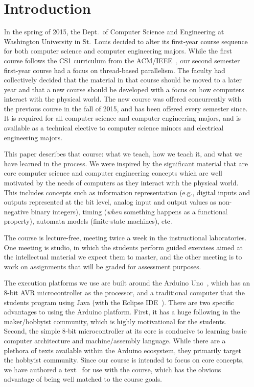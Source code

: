 \section{Introduction}
\label{sec:intro}

In the spring of 2015, the Dept.~of Computer Science and Engineering at
Washington University in St.~Louis decided to alter
its first-year course sequence for both computer science and
computer engineering majors.  While the first course follows
the CS1 curriculum from the ACM/IEEE~\cite{cs13}, our second semester
first-year course had a focus on thread-based parallelism.  The faculty
had collectively decided that the material in that course should be moved
to a later year and that a new course should be developed with a focus on 
how computers interact with the physical world.
The new course was offered concurrently with the previous course in the
fall of 2015, and has been offered every semester since.
It is required for all computer science and computer engineering majors,
and is available as a technical elective to computer science minors and electrical
engineering majors.

This paper describes that course: what we teach, how we teach it, and
what we have learned in the process.
We were inspired by the significant material that are core
computer science and computer engineering concepts which are well motivated
by the needs of computers as they interact with the physical world.
This includes concepts such as information representation (e.g., digital inputs
and outputs represented at the bit level, analog input and output values as
non-negative binary integers),
timing (\emph{when} something happens as a functional property),
automata models (finite-state machines), etc.

The course is lecture-free, meeting twice a week in the
instructional laboratories.  One meeting is studio, in which the
students perform guided exercises aimed at the intellectual material we
expect them to master, and the other meeting is to work on assignments
that will be graded for assessment purposes.

The execution platforms we use are built around the Arduino Uno~\cite{arduino},
which has an 8-bit AVR microcontroller as the processor,
and a traditional computer that the
students program using Java (with the Eclipse IDE~\cite{eclipse}).
There are two specific advantages to using the Arduino platform.
First, it has a huge following in the maker/hobbyist community, which
is highly motivational for the students. 
Second, the simple 8-bit microcontroller at its core is conducive to
learning basic computer architecture and machine/assembly language.
While there are a plethora of texts available within the Arduino
ecosystem, they primarily target the hobbyist community. Since
our course is intended to focus on core concepts, we have authored
a text~\cite{cc17} for use with the course, which has the obvious
advantage of being well matched to the course goals.

